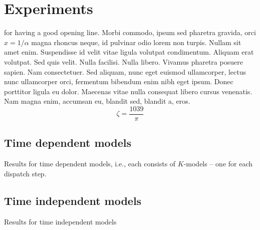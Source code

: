 

\chapter{Experiments }\label{ch:experiments} 

 for having a good opening line. Morbi commodo, ipsum sed pharetra gravida, orci  $x = 1/\alpha$ magna rhoncus neque, id pulvinar odio lorem non turpis. Nullam sit amet enim. Suspendisse id velit vitae ligula volutpat condimentum. Aliquam erat volutpat. Sed quis velit. Nulla facilisi. Nulla libero. Vivamus pharetra posuere sapien. Nam consectetuer. Sed aliquam, nunc eget euismod ullamcorper, lectus nunc ullamcorper orci, fermentum bibendum enim nibh eget ipsum. Donec porttitor ligula eu dolor. Maecenas vitae nulla consequat libero cursus venenatis. Nam magna enim, accumsan eu, blandit sed, blandit a, eros.
$$\zeta = \frac{1039}{\pi}$$


\section{Time dependent models}
\begin{table}[t]
    \caption[Results for time dependent models]{Results for time dependent 
    models, i.e., each consists of $K$-models -- one for each dispatch step. 
    }\label{tbl:compare:dependent}
\end{table}

\section{Time independent models}
\begin{table}[t]
    \caption{Results for time independent models}\label{tbl:compare:independent}
\end{table}

